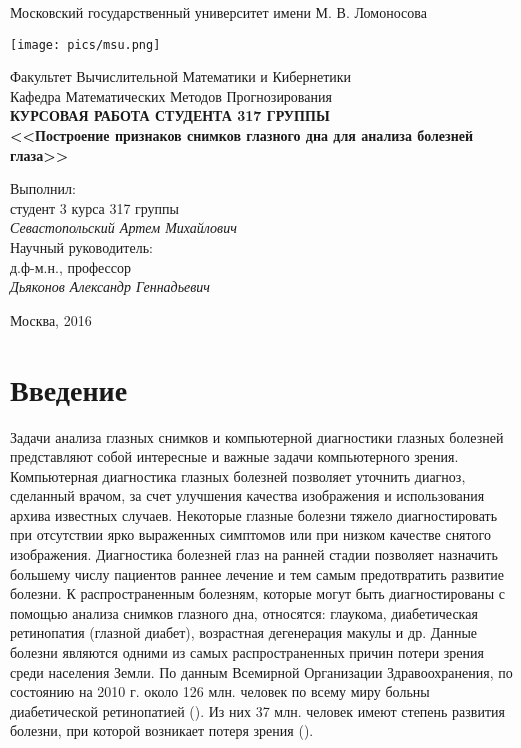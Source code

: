 \documentclass[12pt,fleqn]{article}
\begin{document}
\begin{titlepage}
\begin{center}
Московский государственный университет имени М. В. Ломоносова

\bigskip
\texttt{[image: pics/msu.png]}

\bigskip
Факультет Вычислительной Математики и Кибернетики\\
Кафедра Математических Методов Прогнозирования\\[10mm]

\textsf{\large\bfseries
КУРСОВАЯ РАБОТА СТУДЕНТА 317 ГРУППЫ\\[10mm]
<<Построение признаков снимков глазного дна для анализа болезней глаза>>
}\\[10mm]

\begin{flushright}
\parbox{0.5\textwidth}{
Выполнил:\\
студент 3 курса 317 группы\\
\emph{Севастопольский Артем Михайлович}\\[5mm]
Научный руководитель:\\
д.ф-м.н., профессор\\
\emph{Дьяконов Александр Геннадьевич}
}
\end{flushright}


\vspace{\fill}
Москва, 2016
\end{center}
\end{titlepage}

\newpage
\renewcommand{\contentsname}{Содержание}
\tableofcontents

\newpage
\section{Введение}

Задачи анализа глазных снимков и компьютерной диагностики глазных болезней представляют собой интересные и важные задачи компьютерного зрения. Компьютерная диагностика глазных болезней позволяет уточнить диагноз, сделанный врачом, за счет улучшения качества изображения и использования архива известных случаев. Некоторые глазные болезни тяжело диагностировать при отсутствии ярко выраженных симптомов или при низком качестве снятого изображения. Диагностика болезней глаз на ранней стадии позволяет назначить большему числу пациентов раннее лечение и тем самым предотвратить развитие болезни. К распространенным болезням, которые могут быть диагностированы с помощью анализа снимков глазного дна, относятся: глаукома, диабетическая ретинопатия (глазной диабет), возрастная дегенерация макулы и др. Данные болезни являются одними из самых распространенных причин потери зрения среди населения Земли. По данным Всемирной Организации Здравоохранения, по состоянию на 2010 г. около 126 млн. человек по всему миру больны диабетической ретинопатией (\cite{medical_zheng}). Из них 37 млн. человек имеют степень развития болезни, при которой возникает потеря зрения (\cite{medical_zheng}).
\end{document}
